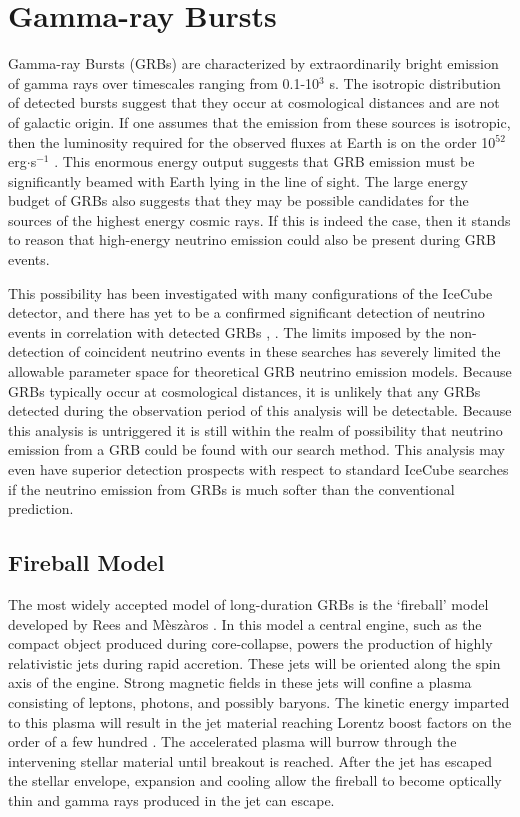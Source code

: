 \documentclass{gatech-thesis}
\begin{document}
\section{Gamma-ray Bursts}
Gamma-ray Bursts (GRBs) are characterized by extraordinarily bright emission of gamma rays over timescales ranging from 0.1-10$^3$ s. The isotropic distribution of detected bursts suggest that they occur at cosmological distances and are not of galactic origin. If one assumes that the emission from these sources is isotropic, then the luminosity required for the observed fluxes at Earth is on the order 10$^{52}$ erg$\cdot$s$^{-1}$ \cite{2004RvMP...76.1143P}. This enormous energy output suggests that GRB emission must be significantly beamed with Earth lying in the line of sight. The large energy budget of GRBs also suggests that they may be possible candidates for the sources of the highest energy cosmic rays. If this is indeed the case, then it stands to reason that high-energy neutrino emission could also be present during GRB events.

This possibility has been investigated with many configurations of the IceCube detector, and there has yet to be a confirmed significant detection of neutrino events in correlation with detected GRBs \cite{2011PhRvL.106n1101A}, \cite{2012Natur.484..351I}. The limits imposed by the non-detection of coincident neutrino events in these searches has severely limited the allowable parameter space for theoretical GRB neutrino emission models. Because GRBs typically occur at cosmological distances, it is unlikely that any GRBs detected during the observation period of this analysis will be detectable. Because this analysis is untriggered it is still within the realm of possibility that neutrino emission from a GRB could be found with our search method. This analysis may even have superior detection prospects with respect to standard IceCube searches if the neutrino emission from GRBs is much softer than the conventional prediction. 

\subsection{Fireball Model}
The most widely accepted model of long-duration GRBs is the `fireball' model developed by Rees and M\`{e}sz\`{a}ros \cite{1992MNRAS.258P..41R}. In this model a central engine, such as the compact object produced during core-collapse, powers the production of highly relativistic jets during rapid accretion. These jets will be oriented along the spin axis of the engine. Strong magnetic fields in these jets will confine a plasma consisting of leptons, photons, and possibly baryons. The kinetic energy imparted to this plasma will result in the jet material reaching Lorentz boost factors on the order of a few hundred \cite{1992MNRAS.258P..41R}. The accelerated plasma will burrow through the intervening stellar material until breakout is reached. After the jet has escaped the stellar envelope, expansion and cooling allow the fireball to become optically thin and gamma rays produced in the jet can escape.
\end{document}
